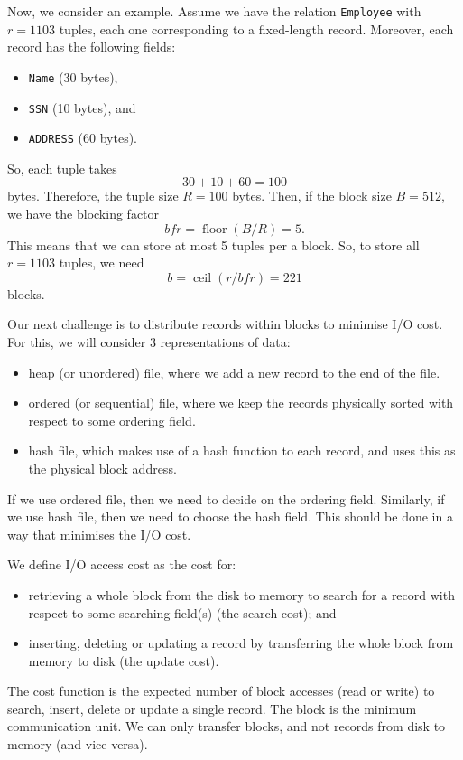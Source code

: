 \documentclass[a4paper, openany]{memoir}
\begin{document}
Now, we consider an example. Assume we have the relation \texttt{Employee} with $r = 1103$ tuples, each one corresponding to a fixed-length record. Moreover, each record has the following fields:
\begin{itemize}
    \item \texttt{Name} (30 bytes),
    \item \texttt{SSN} (10 bytes), and
    \item \texttt{ADDRESS} (60 bytes).
\end{itemize}
So, each tuple takes
\[30 + 10 + 60 = 100\]
bytes. Therefore, the tuple size $R = 100$ bytes. Then, if the block size $B = 512$, we have the blocking factor
\[\textit{bfr} = \operatorname{floor}(B/R) = 5.\]
This means that we can store at most 5 tuples per a block. So, to store all $r = 1103$ tuples, we need
\[b = \operatorname{ceil}(r/\textit{bfr}) = 221\]
blocks.

Our next challenge is to distribute records within blocks to minimise I/O cost. For this, we will consider 3 representations of data:
\begin{itemize}
    \item heap (or unordered) file, where we add a new record to the end of the file.
    \item ordered (or sequential) file, where we keep the records physically sorted with respect to some ordering field.
    \item hash file, which makes use of a hash function to each record, and uses this as the physical block address.
\end{itemize}
If we use ordered file, then we need to decide on the ordering field. Similarly, if we use hash file, then we need to choose the hash field. This should be done in a way that minimises the I/O cost.

We define I/O access cost as the cost for:
\begin{itemize}
    \item retrieving a whole block from the disk to memory to search for a record with respect to some searching field(s) (the search cost); and
    \item inserting, deleting or updating a record by transferring the whole block from memory to disk (the update cost).
\end{itemize}
The cost function is the expected number of block accesses (read or write) to search, insert, delete or update a single record. The block is the minimum communication unit. We can only transfer blocks, and not records from disk to memory (and vice versa).
\end{document}
